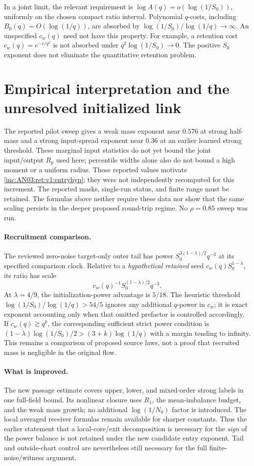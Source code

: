 \documentclass[11pt]{article}
\numberwithin{equation}{section}
\theoremstyle{remark}\newtheorem{remark}[theorem]{Remark}
\newcommand{\1}{\mathbf 1}
\begin{document}
In a joint limit, the relevant requirement is
$\log A(q)=o(\log(1/S_0))$, uniformly on the chosen compact ratio
interval. Polynomial $q$-costs, including $B_0(q)=O(\log(1/q))$, are
absorbed by $\log(1/S_0)/\log(1/q)\to\infty$.
An unspecified $c_w(q)$ need not have this property. For example, a
retention cost $c_w(q)=e^{-c/q^2}$ is not absorbed under
$q^2\log(1/S_0)\to0$. The positive $S_0$ exponent does not eliminate
the quantitative retention problem.

\section{Empirical interpretation and the unresolved initialized link}
\label{inc:AN03:ret:v1:status}
The reported pilot sweep gives a weak mass exponent near $0.576$ at
strong half-mass and a strong input-spread exponent near $0.36$ at an
earlier learned strong threshold. These marginal input statistics do not
yet bound the joint input/output $R_p$ used here; percentile widths alone
also do not bound a high moment or a uniform radius. Those reported values motivate
\eqref{inc:AN03:ret:v1:entryhyp}; they were not independently recomputed
for this increment. The reported masks, single-run status, and finite
range must be retained. The formulas above neither require these data
nor show that the same scaling persists in the deeper proposed round-trip
regime. No $\rho=0.85$ sweep was run.

\paragraph{Recruitment comparison.}
The reviewed zero-noise target-only outer tail has power
$S_0^{3(1-\lambda)/2}q^{-3}$ at its specified comparison clock.
Relative to a \emph{hypothetical retained} seed $c_w(q)S_0^{1-\lambda}$,
its ratio has scale
\[
 c_w(q)^{-1}S_0^{(1-\lambda)/2}q^{-3}.
\]
At $\lambda=4/9$, the initialization-power advantage is $5/18$.
The heuristic threshold $\log(1/S_0)/\log(1/q)>54/5$ ignores any
additional $q$-power in $c_w$; it is exact exponent accounting only when
that omitted prefactor is controlled accordingly. If
$c_w(q)\gtrsim q^k$, the corresponding sufficient strict power condition
is $(1-\lambda)\log(1/S_0)/2>(3+k)\log(1/q)$ with a margin tending
to infinity. This remains a comparison of proposed source laws, not a
proof that recruited mass is negligible in the original flow.

\paragraph{What is improved.}
The new passage estimate covers upper, lower, and mixed-order strong
labels in one full-field bound. Its nonlinear closure uses $R_1$, the
mean-imbalance budget, and the weak mass growth; no additional
$\log(1/N_0)$ factor is introduced. The local averaged receiver formulas
remain available for sharper constants. Thus the earlier statement that
a local-core/exit decomposition is necessary for the \emph{sign} of the
power balance is not retained under the new candidate entry exponent.
Tail and outside-chart control are nevertheless still necessary for the
full finite-noise/witness argument.
\end{document}

